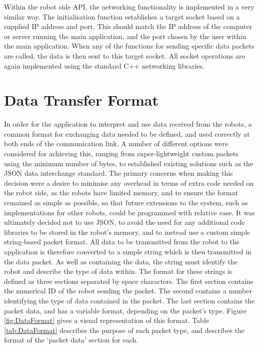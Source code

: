 Within the robot side API, the networking functionality is implemented in a very similar way. The initialisation function establishes a target socket based on a supplied IP address and port. This should match the IP address of the computer or server running the main application, and the port chosen by the user within the main application. When any of the functions for sending specific data packets are called, the data is then sent to this target socket. All socket operations are again implemented using the standard C++ networking libraries.


\section{Data Transfer Format} \label{DataTransferFormat}
In order for the application to interpret and use data received from the robots, a common format for exchanging data needed to be defined, and used correctly at both ends of the communication link. A number of different options were considered for achieving this, ranging from super-lightweight custom packets using the minimum number of bytes, to established existing solutions such as the JSON data interchange standard. The primary concerns when making this decision were a desire to minimise any overhead in terms of extra code needed on the robot side, as the robots have limited memory, and to ensure the format remained as simple as possible, so that future extensions to the system, such as implementations for other robots, could be programmed with relative ease. It was ultimately decided not to use JSON, to avoid the need for any additional code libraries to be stored in the robot's memory, and to instead use a custom simple string-based packet format. All data to be transmitted from the robot to the application is therefore converted to a simple string which is then transmitted in the data packet. As well as containing the data, the string must identify the robot and describe the type of data within. The format for these strings is defined as three sections separated by space characters. The first section contains the numerical ID of the robot sending the packet. The second contains a number identifying the type of data contained in the packet. The last section contains the packet data, and has a variable format, depending on the packet's type. Figure \ref{fig:DataFormat} gives a visual representation of this format. Table \ref{tab:DataFormat} describes the purpose of each packet type, and describes the format of the `packet data' section for each.

